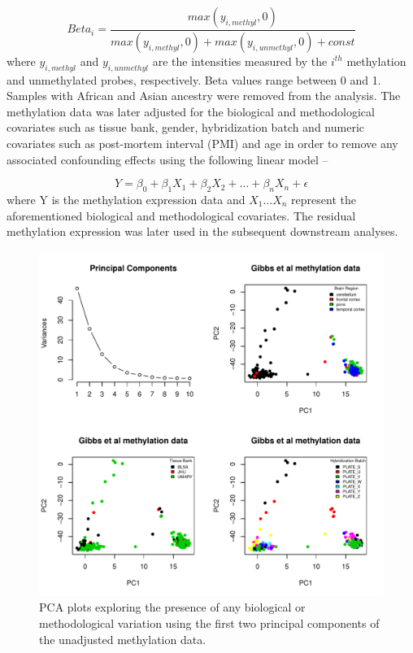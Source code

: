 \documentclass[hidelinks]{article}
\begin{document}
\begin{equation*}
Beta_i = \frac{ max(y_{i,methyl},0) }{max(y_{i,methyl},0) + max(y_{i,unmethyl},0) + const}
\end{equation*}
where $y_{i,methyl}$ and $y_{i,unmethyl}$ are the intensities measured by the $i^{th}$ methylation and unmethylated probes, respectively. Beta values range between 0 and 1. Samples with African and Asian ancestry were removed from the analysis. The methylation data was later adjusted for the biological and methodological covariates such as tissue bank, gender, hybridization batch and numeric covariates such as post-mortem interval (PMI) and age in order to remove any associated confounding effects using the following linear model --

\begin{equation*}
Y = \beta_0 + \beta_1 X_1 + \beta_2 X_2 + \ldots + \beta_n X_n + \epsilon
\end{equation*}
where Y is the methylation expression data and $X_1 \ldots X_n$ represent the aforementioned biological and methodological covariates. The residual methylation expression was later used in the subsequent downstream analyses. 

\begin{center}
\begin{figure}[!ht]
\includegraphics[width=\textwidth]{pca_meth_exp.pdf}
\caption[PCA plots of the methylation data]{PCA plots exploring the presence of any biological or methodological variation using the first two principal components of the unadjusted methylation data.}
\end{figure}
\end{center}
\end{document}
